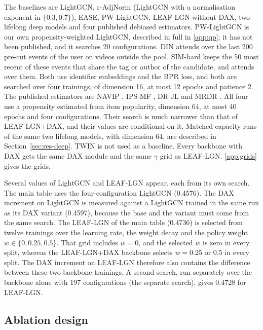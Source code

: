 The baselines are LightGCN, r-AdjNorm (LightGCN with a normalisation exponent in $\{0.3,0.7\}$), EASE, PW-LightGCN, LEAF-LGN without DAX, two
lifelong deep models and four published debiased estimators. PW-LightGCN is our own propensity-weighted LightGCN, described in full in
\ref{app:qp}; it has not been published, and it searches 20 configurations. DIN \citep{zhou2018din} attends over the last 200 pre-cut
events of the user on videos outside the pool. SIM-hard \citep{pi2020sim} keeps the 50 most recent of these events that share the tag or author
of the candidate, and attends over them. Both use identifier embeddings and the BPR loss, and both are searched over four trainings, of dimension
16, at most 12 epochs and patience 2. The published estimators are NAVIP \citep{kim2022navip}, IPS-MF \citep{schnabel2016}, DR-JL \citep{wang2019drjl}
and MRDR \citep{guo2021mrdr}. All four use a propensity estimated from item popularity, dimension 64, at most 40 epochs and four configurations.
Their search is much narrower than that of LEAF-LGN+DAX, and their values are conditional on it. Matched-capacity runs of the same two
lifelong models, with dimension 64, are described in Section~\ref{sec:res-deep}. TWIN \citep{chang2023twin} is not used as a
baseline. Every backbone with DAX gets the same DAX module and the same $\gamma$ grid as LEAF-LGN. \ref{app:grids} gives the grids.

Several values of LightGCN and LEAF-LGN appear, each from its own search. The main table uses the four-configuration LightGCN (0.4576). The DAX increment on
LightGCN is measured against a LightGCN trained in the same run as its DAX variant (0.4597), because the base and the variant must come from the
same search. The LEAF-LGN of the main table (0.4736) is selected from twelve trainings over the learning rate, the weight decay and the policy
weight $w\in\{0,0.25,0.5\}$. That grid includes $w=0$, and the selected $w$ is zero in every split, whereas the LEAF-LGN+DAX backbone selects
$w=0.25$ or $0.5$ in every split. The DAX increment on LEAF-LGN therefore also contains the difference between these two backbone trainings. A
second search, run separately over the backbone alone with 197 configurations (the separate search), gives 0.4728 for LEAF-LGN.

\subsection{Ablation design}
\label{sec:protocol-ablation}

